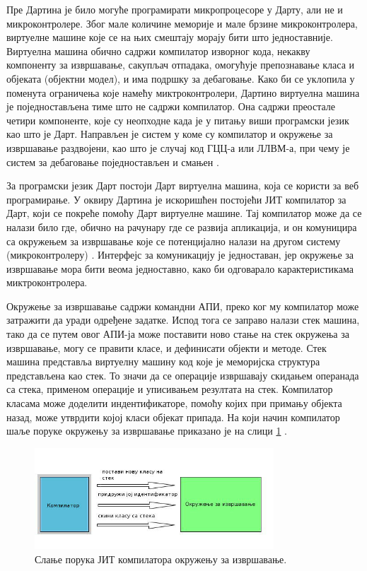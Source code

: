 \documentclass[12pt,oneside]{memoir}
\begin{document}
Пре Дартина је било могуће програмирати микропроцесоре у Дарту, али не и микроконтролере. Због мале количине меморије и мале брзине микроконтролера, виртуелне машине које се на њих смештају морају бити што једноставније. Виртуелна машина обично садржи компилатор изворног кода, некакву компоненту за извршавање, сакупљач отпадака, омогућује препознавање класа и објеката (објектни модел), и има подршку за дебаговање. Како би се уклопила у поменута ограничења које намећу миктроконтролери, Дартино виртуелна машина је поједностављена тиме што не садржи компилатор. Она садржи преостале четири компоненте, које су неопходне када је у питању виши програмски језик као што је Дарт. Направљен је систем у коме су компилатор и окружење за извршавање раздвојени, као што је случај код ГЦЦ-а или ЛЛВМ-а, при чему је систем за дебаговање поједностављен и смањен \cite{Dartino}.

За програмски језик Дарт постоји Дарт виртуелна машина, која се користи за веб програмирање. У оквиру Дартина је искоришћен постојећи ЈИТ компилатор за Дарт, који се покреће помоћу Дарт виртуелне машине. Тај компилатор може да се налази било где, обично на рачунару где се развија апликација, и он комуницира са окружењем за извршавање које се потенцијално налази на другом систему (микроконтролеру) \cite{Dartino}. Интерфејс за комуникацију је једноставан, јер окружење за извршавање мора бити веома једноставно, како би одговарало карактеристикама миктроконтролера.

Окружење за извршавање садржи командни АПИ, преко ког му компилатор може затражити да уради одређене задатке. Испод тога се заправо налази стек машина, тако да се путем овог АПИ-ја може поставити ново стање на стек окружења за извршавање, могу се правити класе, и дефинисати објекти и методе. Стек машина представља виртуелну машину код које је меморијска структура представљена као стек. То значи да се операције извршавају скидањем операнада са стека, применом операције и уписивањем резултата на стек. Компилатор класама може доделити индентификаторе, помоћу којих при примању објекта назад, може утврдити којој класи објекат припада. На који начин компилатор шаље поруке окружењу за извршавање приказано је на слици \ref{fig:komunikacija} \cite{Dartino}.

\begin{figure}[!ht]
  \centering
  \includegraphics[width=0.8\textwidth]{compiler.jpg}
  \caption{Слање порука ЈИТ компилатора окружењу за извршавање.}
  \label{fig:komunikacija}
\end{figure}
\end{document}
